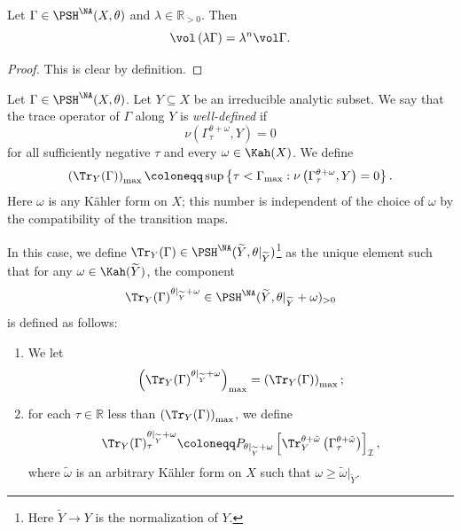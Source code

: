\begin{proposition}\label{prop:vol_NA_resc}
    Let $\Gamma\in \PSH^{\NA}(X,\theta)$ and $\lambda\in \mathbb{R}_{>0}$. Then
    \[
    \vol \left( \lambda \Gamma \right)=\lambda^n \vol \Gamma.
    \]
\end{proposition}
\begin{proof}
    This is clear by definition.
\end{proof}

\begin{definition}\label{def:NApotential:L623}
    Let $\Gamma\in \PSH^{\NA}(X,\theta)$. Let $Y\subseteq X$ be an irreducible analytic subset. We say that the trace operator of $\Gamma$ along $Y$ is \emph{well-defined} if
    \[
    \nu\left(\Gamma_{\tau}^{\theta+\omega},Y\right)=0
    \]
    for all sufficiently negative $\tau$ and every $\omega\in \Kah(X)$. We define
    \[
    \left(\Tr_Y(\Gamma)\right)_{\max}\coloneqq \sup\left\{ \tau<\Gamma_{\max}: \nu\left(\Gamma_{\tau}^{\theta+\omega},Y\right)=0\right\}.
    \]
    Here $\omega$ is any K\"ahler form on $X$; this number is independent of the choice of $\omega$ by the compatibility of the transition maps.


    In this case, we define $\Tr_Y(\Gamma)\in \PSH^{\NA}(\widetilde{Y},\theta|_{\widetilde{Y}})$\footnote{Here $\widetilde{Y}\rightarrow Y$ is the normalization of $Y$.} as the unique element such that for any $\omega\in \Kah(\widetilde{Y})$, the component
    \begin{equation}\label{eq:TrYinPSHNAg0}
    \Tr_Y(\Gamma)^{\theta|_{\widetilde{Y}}+\omega}\in \PSH^{\NA}(\widetilde{Y},\theta|_{\widetilde{Y}}+\omega)_{>0}
    \end{equation}
    is defined as follows:
    \begin{enumerate}
        \item\label{itm:eq:TrYinPSHNAg0:1} We let
        \begin{equation}\label{eq:tracemax}
        \left( \Tr_Y(\Gamma)^{\theta|_{\widetilde{Y}}+\omega} \right)_{\max}=\left(\Tr_Y(\Gamma)\right)_{\max};
        \end{equation}
        \item\label{itm:eq:TrYinPSHNAg0:2} for each $\tau\in \mathbb{R}$ less than $\left(\Tr_Y(\Gamma)\right)_{\max}$, we define
        \[
        \Tr_Y(\Gamma)^{\theta|_{\widetilde{Y}}+\omega}_{\tau}\coloneqq P_{\theta|_{\widetilde{Y}}+\omega}\left[ \Tr_Y^{\theta+\tilde{\omega}}\left(\Gamma^{\theta+\tilde{\omega}}_{\tau}\right) \right]_{\mathcal{I}},
        \]
        where $\tilde{\omega}$ is an arbitrary K\"ahler form on $X$ such that $\omega\geq \tilde{\omega}|_{\widetilde{Y}}$.
    \end{enumerate}
\end{definition}
